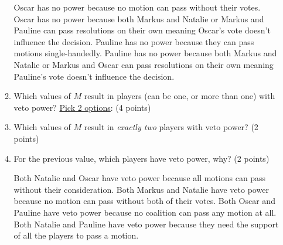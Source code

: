 \documentclass[12pt]{exam}
\begin{document}
\begin{enumerate}
\begin{enumerate}
\begin{checkboxes}
    \choice Oscar has no power because no motion can pass without their votes.
    \choice Oscar has no power because both Markus and Natalie or Markus and Pauline can pass resolutions on their own meaning Oscar's vote doesn't influence the decision.
    \choice Pauline has no power because they can pass motions single-handedly.
    \choice Pauline has no power because both Markus and Natalie or Markus and Oscar can pass resolutions on their own meaning Pauline's vote doesn't influence the decision.
\end{checkboxes}
\vfill
\item Which values of $M$ result in players (can be one, or more than one) with veto power? \underline{Pick 2 options}: (4 points)
\begin{checkboxes}
\end{checkboxes}
\vfill
\item Which values of $M$ result in \emph{exactly two} players with veto power? (2 points)
\begin{checkboxes}
\end{checkboxes}
\vfill
\item \label{lastQnSec2} For the previous value, which players have veto power, why? (2 points)
\begin{checkboxes}
    \choice Both Natalie and Oscar have veto power because all motions can pass without their consideration.
    \choice Both Markus and Natalie have veto power because no motion can pass without both of their votes.
    \choice Both Oscar and Pauline have veto power because no coalition can pass any motion at all.
    \choice Both Natalie and Pauline have veto power because they need the support of all the players to pass a motion.
\end{checkboxes}
\vfill
\end{enumerate}
\newpage


\end{enumerate}
\end{document}
